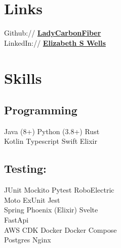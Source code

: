\documentclass[letterpaper]{deedy-resume-openfont} %
\begin{document}
\begin{minipage}[t]{0.33\textwidth}

\section{Links}

Github:// \href{https://github.com/ladycarbonfiber}{\bf LadyCarbonFiber } \\
LinkedIn:// \href{https://www.linkedin.com/in/elizabethswells/s}{\bf Elizabeth S Wells} \\




\sectionspace %


\section{Skills}

\subsection{Programming}
Java (8+) \textbullet{} Python (3.8+) \textbullet{} Rust \\
 Kotlin \textbullet{} Typescript \textbullet{} Swift \textbullet{} Elixir
\subsection {Testing:}
JUnit \textbullet{} Mockito \textbullet{} Pytest \textbullet{} RoboElectric \\ Moto \textbullet{} ExUnit \textbullet{} Jest\\
Spring \textbullet{} Phoenix (Elixir) \textbullet{} Svelte\\ \textbullet{} FastApi\\
AWS \textbullet{} CDK \textbullet{} Docker \textbullet{} Docker Compose \\
Postgres  \textbullet{} Nginx


\sectionspace %



\end{minipage}
\end{document}
